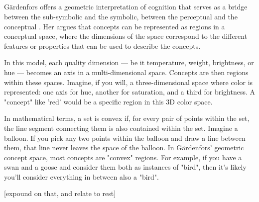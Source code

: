 \subsection{ \label{subsec:gaerdenfors}}

Gärdenfors offers a geometric interpretation of cognition that serves as a bridge between the sub-symbolic and the symbolic, between the perceptual and the conceptual \cite{Gaerdenfors}. Her argues that concepts can be represented as regions in a conceptual space, where the dimensions of the space correspond to the different features or properties that can be used to describe the concepts.

In this model, each quality dimension — be it temperature, weight, brightness, or hue — becomes an axis in a multi-dimensional space. Concepts are then regions within these spaces. Imagine, if you will, a three-dimensional space where color is represented: one axis for hue, another for saturation, and a third for brightness. A "concept" like 'red' would be a specific region in this 3D color space.


In mathematical terms, a set is convex if, for every pair of points within the set, the line segment connecting them is also contained within the set. Imagine a balloon. If you pick any two points within the balloon and draw a line between them, that line never leaves the space of the balloon. In Gärdenfors' geometric concept space, most concepts are "convex" regions. For example, if you have a swan and a goose and consider them both as instances of "bird", then it's likely you'll consider everything in between also a "bird".


[expound on that, and relate to rest]




